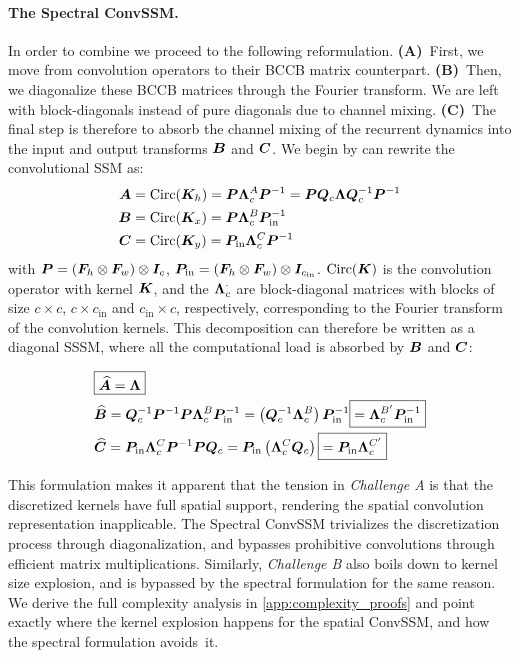 \documentclass{article}
\begin{document}
\paragraph{The Spectral ConvSSM.} In order to combine  we proceed to the following reformulation. \textbf{(A)}~First, we move from convolution operators to their BCCB matrix counterpart. \textbf{(B)}~Then, we diagonalize these BCCB matrices through the Fourier transform. We are left with block-diagonals instead of pure diagonals due to channel mixing. \textbf{(C)}~The final step is therefore to absorb the channel mixing of the recurrent dynamics into the input and output transforms $\bm{B}$ and $\bm{C}$. We begin by can rewrite the convolutional SSM as:
%
\begin{align}
\label{eq:convssm:A}
\bm{A} &= \mathrm{Circ}(\bm{K}_h) = \bm{P} \bm{\Lambda}^A_c \bm{P}^{-1} = \bm{P} \bm{Q}_c \bm{\Lambda} \bm{Q}_c^{-1} \bm{P}^{-1} \\
\label{eq:convssm:B}
\bm{B} &= \mathrm{Circ}(\bm{K}_x) = \bm{P} \bm{\Lambda}^B_c \bm{P}_{\mathrm{in}}^{-1} \\
\label{eq:convssm:C}
\bm{C} &= \mathrm{Circ}(\bm{K}_y) = \bm{P}_{\mathrm{in}} \bm{\Lambda}^C_c \bm{P}^{-1}
\end{align}
%
with $\bm{P} = (\bm{F}_h \otimes \bm{F}_w) \otimes \bm{I}_c$, $\bm{P}_{\mathrm{in}} = (\bm{F}_h \otimes \bm{F}_w) \otimes \bm{I}_{c_\mathrm{in}}$. $\mathrm{Circ}(\bm{K})$ is the convolution operator with kernel $\bm{K}$, and the $\bm{\Lambda}^{\cdot}_c$ are block-diagonal matrices with blocks of size $c \!\times\! c$, $c \!\times\! c_\mathrm{in}$ and $c_\mathrm{in} \!\times\! c$, respectively, corresponding to the Fourier transform of the convolution kernels.
%
This decomposition can therefore be written as a diagonal SSSM, where all the computational load is absorbed by $\bm{B}$ and $\bm{C}$:

\begin{align}
\label{eq:convssm}
&\boxed{\widehat{\bm{A}} = \bm{\Lambda}} \\
&\widehat{\bm{B}} = \bm{Q}_c^{-1} \bm{P}^{-1} \bm{P} \bm{\Lambda}^B_c \bm{P}_{\mathrm{in}}^{-1} = \left(\bm{Q}_c^{-1} \bm{\Lambda}^B_c\right) \bm{P}_{\mathrm{in}}^{-1} \boxed{= \bm{\Lambda}^{B'}_c \bm{P}_{\mathrm{in}}^{-1}} \\
&\widehat{\bm{C}} = \bm{P}_{\mathrm{in}} \bm{\Lambda}^C_c \bm{P}^{-1} \bm{P} \bm{Q}_c = \bm{P}_{\mathrm{in}} \left(\bm{\Lambda}^C_c \bm{Q}_c\right) \boxed{= \bm{P}_{\mathrm{in}} \bm{\Lambda}^{C'}_c}
\end{align}

This formulation makes it apparent that the tension in \emph{Challenge A} is that the discretized kernels have full spatial support, rendering the spatial convolution representation inapplicable. The Spectral ConvSSM trivializes the discretization process through diagonalization, and bypasses prohibitive convolutions through efficient matrix multiplications.
%
Similarly, \emph{Challenge B} also boils down to kernel size explosion, and is bypassed by the spectral formulation for the same reason. We derive the full complexity analysis in \cref{app:complexity_proofs} and point exactly where the kernel explosion happens for the spatial ConvSSM, and how the spectral formulation avoids~it.
\end{document}
